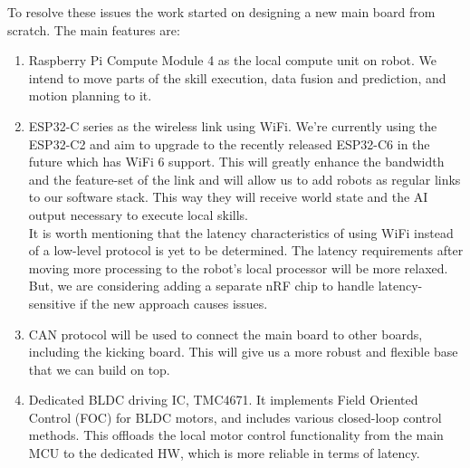 \documentclass[runningheads]{llncs}
\begin{document}
To resolve these issues the work started on designing a new main board from scratch. The main features are:
\begin{enumerate}
    \item Raspberry Pi Compute Module 4 as the local compute unit on robot. We intend to move parts of the skill execution, data fusion and prediction, and motion planning to it.
    \item ESP32-C series as the wireless link using WiFi. We're currently using the ESP32-C2 and aim to upgrade to the recently released ESP32-C6 in the future which has WiFi 6 support. This will greatly enhance the bandwidth and the feature-set of the link and will allow us to add robots as regular links to our software stack. This way they will receive world state and the AI output necessary to execute local skills.\\
    It is worth mentioning that the latency characteristics of using WiFi instead of a low-level protocol is yet to be determined. The latency requirements after moving more processing to the robot's local processor will be more relaxed. But, we are considering adding a separate nRF chip to handle latency-sensitive if the new approach causes issues.
    \item CAN protocol will be used to connect the main board to other boards, including the kicking board. This will give us a more robust and flexible base that we can build on top.
    \item Dedicated BLDC driving IC, TMC4671. It implements  Field Oriented Control (FOC) for BLDC motors, and includes various closed-loop control methods. This offloads the local motor control functionality from the main MCU to the dedicated HW, which is more reliable in terms of latency.
\end{enumerate}
\end{document}
